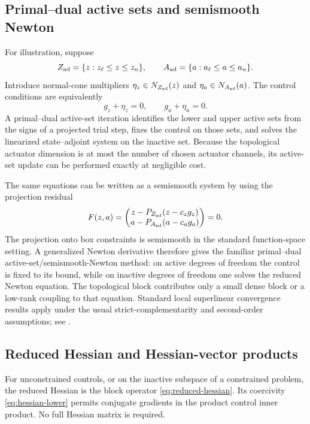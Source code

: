 \documentclass{article}
\begin{document}
\subsection{Primal--dual active sets and semismooth Newton}
\label{sec:active-set}

For illustration, suppose
\[
  Z_{\rm ad}=\{z:z_\ell\le z\le z_u\},
  \qquad
  A_{\rm ad}=\{a:a_\ell\le a\le a_u\}.
\]
Introduce normal-cone multipliers $\eta_z\in N_{Z_{\rm ad}}(z)$ and $\eta_a\in N_{A_{\rm ad}}(a)$.  The control conditions are equivalently
\[
  g_z+\eta_z=0,
  \qquad
  g_a+\eta_a=0.
\]
A primal--dual active-set iteration identifies the lower and upper active sets from the signs of a projected trial step, fixes the control on those sets, and solves the linearized state--adjoint system on the inactive set.  Because the topological actuator dimension is at most the number of chosen actuator channels, its active-set update can be performed exactly at negligible cost.

The same equations can be written as a semismooth system by using the projection residual
\[
  F(z,a)=
  \begin{pmatrix}
    z-P_{Z_{\rm ad}}(z-c_zg_z)\\
    a-P_{A_{\rm ad}}(a-c_ag_a)
  \end{pmatrix}=0.
\]
The projection onto box constraints is semismooth in the standard function-space setting.  A generalized Newton derivative therefore gives the familiar primal--dual active-set/semismooth-Newton method: on active degrees of freedom the control is fixed to its bound, while on inactive degrees of freedom one solves the reduced Newton equation.  The topological block contributes only a small dense block or a low-rank coupling to that equation.  Standard local superlinear convergence results apply under the usual strict-complementarity and second-order assumptions; see \cite{ulbrich2002semismooth,de2015numerical}.

\subsection{Reduced Hessian and Hessian-vector products}
\label{sec:hessian-methods}

For unconstrained controls, or on the inactive subspace of a constrained problem, the reduced Hessian is the block operator \eqref{eq:reduced-hessian}.  Its coercivity \eqref{eq:hessian-lower} permits conjugate gradients in the product control inner product.  No full Hessian matrix is required.
\end{document}
